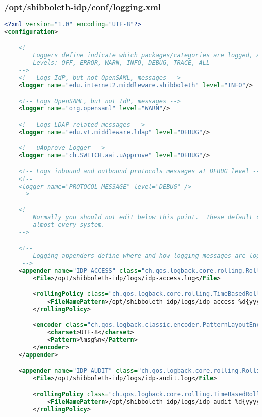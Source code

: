 \subsubsection{/opt/shibboleth-idp/conf/logging.xml}
\begin{lstlisting}[language=xml]
<?xml version="1.0" encoding="UTF-8"?>
<configuration>

    <!--
        Loggers define indicate which packages/categories are logged, at which level, and to which appender.
        Levels: OFF, ERROR, WARN, INFO, DEBUG, TRACE, ALL
    -->
    <!-- Logs IdP, but not OpenSAML, messages -->
    <logger name="edu.internet2.middleware.shibboleth" level="INFO"/>

    <!-- Logs OpenSAML, but not IdP, messages -->
    <logger name="org.opensaml" level="WARN"/>

    <!-- Logs LDAP related messages -->
    <logger name="edu.vt.middleware.ldap" level="DEBUG"/>

    <!-- uApprove Logger -->
    <logger name="ch.SWITCH.aai.uApprove" level="DEBUG"/>

    <!-- Logs inbound and outbound protocols messages at DEBUG level -->
    <!--
    <logger name="PROTOCOL_MESSAGE" level="DEBUG" />
    -->

    <!--
        Normally you should not edit below this point.  These default configurations are sufficient for
        almost every system.
    -->

    <!--
        Logging appenders define where and how logging messages are logged.
     -->
    <appender name="IDP_ACCESS" class="ch.qos.logback.core.rolling.RollingFileAppender">
        <File>/opt/shibboleth-idp/logs/idp-access.log</File>

        <rollingPolicy class="ch.qos.logback.core.rolling.TimeBasedRollingPolicy">
            <FileNamePattern>/opt/shibboleth-idp/logs/idp-access-%d{yyyy-MM-dd}.log</FileNamePattern>
        </rollingPolicy>

        <encoder class="ch.qos.logback.classic.encoder.PatternLayoutEncoder">
            <charset>UTF-8</charset>
            <Pattern>%msg%n</Pattern>
        </encoder>
    </appender>

    <appender name="IDP_AUDIT" class="ch.qos.logback.core.rolling.RollingFileAppender">
        <File>/opt/shibboleth-idp/logs/idp-audit.log</File>

        <rollingPolicy class="ch.qos.logback.core.rolling.TimeBasedRollingPolicy">
            <FileNamePattern>/opt/shibboleth-idp/logs/idp-audit-%d{yyyy-MM-dd}.log</FileNamePattern>
        </rollingPolicy>


\end{lstlisting}
